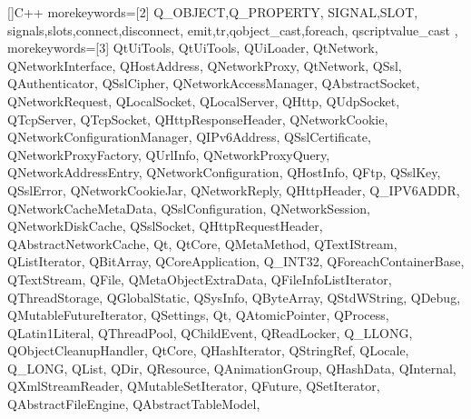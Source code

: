%
%
%
%

[]{C++}%
{%
  morekeywords=[2]{%
    Q_OBJECT,Q_PROPERTY,%
    SIGNAL,SLOT,%
    signals,slots,connect,disconnect,%
    emit,tr,qobject_cast,foreach,%
    qscriptvalue_cast%
  },%
  morekeywords=[3]{%
    QtUiTools,%
    QtUiTools,%
    QUiLoader,%
    QtNetwork,%
    QNetworkInterface,%
    QHostAddress,%
    QNetworkProxy,%
    QtNetwork,%
    QSsl,%
    QAuthenticator,%
    QSslCipher,%
    QNetworkAccessManager,%
    QAbstractSocket,%
    QNetworkRequest,%
    QLocalSocket,%
    QLocalServer,%
    QHttp,%
    QUdpSocket,%
    QTcpServer,%
    QTcpSocket,%
    QHttpResponseHeader,%
    QNetworkCookie,%
    QNetworkConfigurationManager,%
    QIPv6Address,%
    QSslCertificate,%
    QNetworkProxyFactory,%
    QUrlInfo,%
    QNetworkProxyQuery,%
    QNetworkAddressEntry,%
    QNetworkConfiguration,%
    QHostInfo,%
    QFtp,%
    QSslKey,%
    QSslError,%
    QNetworkCookieJar,%
    QNetworkReply,%
    QHttpHeader,%
    Q_IPV6ADDR,%
    QNetworkCacheMetaData,%
    QSslConfiguration,%
    QNetworkSession,%
    QNetworkDiskCache,%
    QSslSocket,%
    QHttpRequestHeader,%
    QAbstractNetworkCache,%
    Qt,%
    QtCore,%
    QMetaMethod,%
    QTextIStream,%
    QListIterator,%
    QBitArray,%
    QCoreApplication,%
    Q_INT32,%
    QForeachContainerBase,%
    QTextStream,%
    QFile,%
    QMetaObjectExtraData,%
    QFileInfoListIterator,%
    QThreadStorage,%
    QGlobalStatic,%
    QSysInfo,%
    QByteArray,%
    QStdWString,%
    QDebug,%
    QMutableFutureIterator,%
    QSettings,%
    Qt,%
    QAtomicPointer,%
    QProcess,%
    QLatin1Literal,%
    QThreadPool,%
    QChildEvent,%
    QReadLocker,%
    Q_LLONG,%
    QObjectCleanupHandler,%
    QtCore,%
    QHashIterator,%
    QStringRef,%
    QLocale,%
    Q_LONG,%
    QList,%
    QDir,%
    QResource,%
    QAnimationGroup,%
    QHashData,%
    QInternal,%
    QXmlStreamReader,%
    QMutableSetIterator,%
    QFuture,%
    QSetIterator,%
    QAbstractFileEngine,%
    QAbstractTableModel,%
}}
